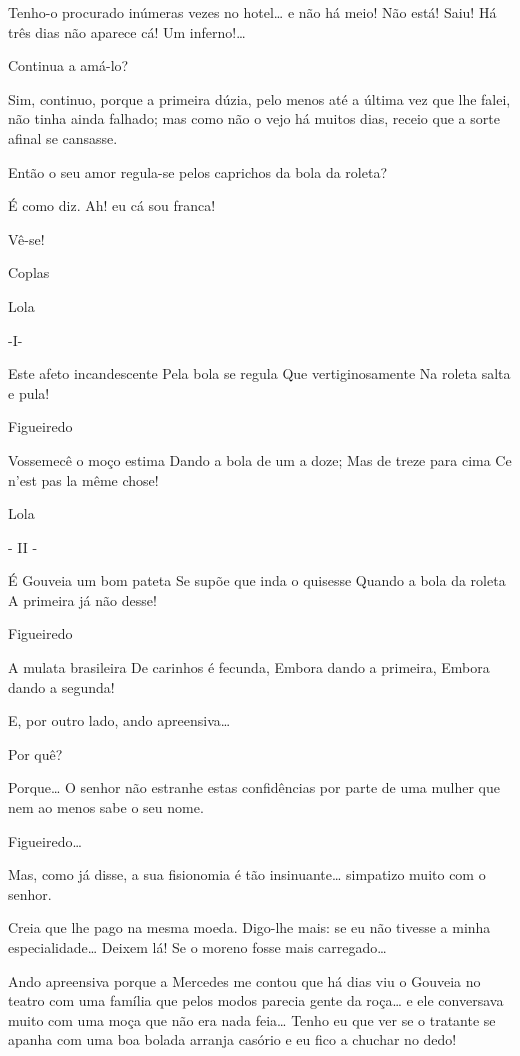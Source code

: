  Tenho-o procurado inúmeras vezes no hotel\ldots{} e não há meio! Não
está! Saiu! Há três dias não aparece cá! Um inferno!\ldots{}

 Continua a amá-lo?

 Sim, continuo, porque a primeira dúzia, pelo menos até a última vez
que lhe falei, não tinha ainda falhado; mas como não o vejo há muitos dias, receio
que a sorte afinal se cansasse.

 Então o seu amor regula-se pelos caprichos da bola da roleta?

 É como diz. Ah! eu cá sou franca!

 Vê-se!

Coplas

 Lola

 -I-

 Este afeto incandescente
 Pela bola se regula
 Que vertiginosamente
 Na roleta salta e pula!

 Figueiredo

 Vossemecê o moço estima
 Dando a bola de um a doze;
 Mas de treze para cima
 Ce n’est pas la même chose!

 Lola

 - II -

 É Gouveia um bom pateta
 Se supõe que inda o quisesse
 Quando a bola da roleta
 A primeira já não desse!

 Figueiredo

 A mulata brasileira
 De carinhos é fecunda,
 Embora dando a primeira,
 Embora dando a segunda!

 E, por outro lado, ando apreensiva\ldots{}

 Por quê?

 Porque\ldots{} O senhor não estranhe estas confidências por parte de uma
mulher que nem ao menos sabe o seu nome.

 Figueiredo\ldots{}

 Mas, como já disse, a sua fisionomia é tão insinuante\ldots{} simpatizo
muito com o senhor.

 Creia que lhe pago na mesma moeda. Digo-lhe mais: se eu não
tivesse a minha especialidade\ldots{}  Deixem lá! Se o moreno fosse
mais carregado\ldots{}

 Ando apreensiva porque a Mercedes me contou que há dias viu o
Gouveia no teatro com uma família que pelos modos parecia gente da roça\ldots{} e ele
conversava muito com uma moça que não era nada feia\ldots{} Tenho eu que ver se
o tratante se apanha com uma boa bolada arranja casório e eu fico a chuchar
no dedo!

